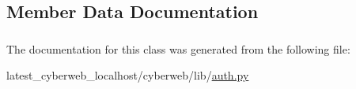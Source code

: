 \subsection{\-Member \-Data \-Documentation}
\hypertarget{classcyberweb_1_1lib_1_1auth_1_1_valid_group_member_abbe25c3fee6f4413237f596c26d8a7f7}{
\subsubsection[{group\-\_\-array}]{}}\label{classcyberweb_1_1lib_1_1auth_1_1_valid_group_member_abbe25c3fee6f4413237f596c26d8a7f7}


\-The documentation for this class was generated from the following file\-:\begin{DoxyCompactItemize}
\item 
latest\-\_\-cyberweb\-\_\-localhost/cyberweb/lib/\hyperlink{lib_2auth_8py}{auth.\-py}\end{DoxyCompactItemize}
